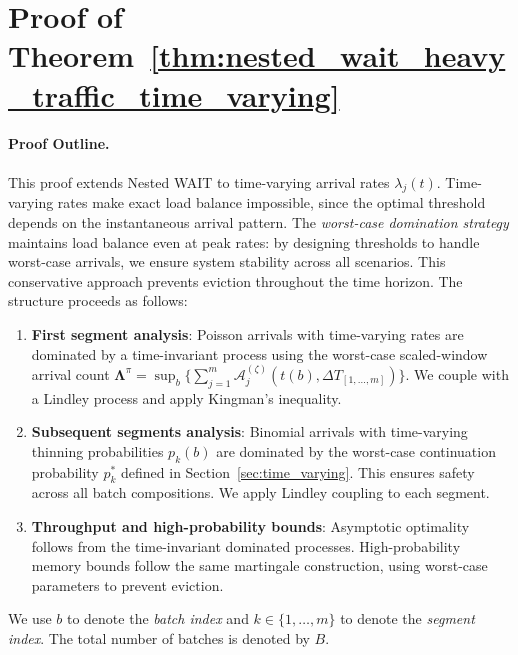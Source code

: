 
\section{Proof of Theorem~\ref{thm:nested_wait_heavy_traffic_time_varying}}\label{appendix:: proof of nested optimality, time varying.}

\paragraph{Proof Outline.}
This proof extends Nested WAIT to time-varying arrival rates $\lambda_j(t)$. Time-varying rates make exact load balance impossible, since the optimal threshold depends on the instantaneous arrival pattern. The \emph{worst-case domination strategy} maintains load balance even at peak rates: by designing thresholds to handle worst-case arrivals, we ensure system stability across all scenarios. This conservative approach prevents eviction throughout the time horizon. The structure proceeds as follows:
\begin{enumerate}
    \item \textbf{First segment analysis}: Poisson arrivals with time-varying rates are dominated by a time-invariant process using the worst-case scaled-window arrival count $\mathbf{\Lambda}^{\pi} = \sup_b \{\sum_{j=1}^m \mathcal A_j^{(\zeta)}(t(b),\Delta T_{[1,\ldots,m]})\}$. We couple with a Lindley process and apply Kingman's inequality.
    \item \textbf{Subsequent segments analysis}: Binomial arrivals with time-varying thinning probabilities $p_k(b)$ are dominated by the worst-case continuation probability \(p_k^*\) defined in Section~\ref{sec:time_varying}. This ensures safety across all batch compositions. We apply Lindley coupling to each segment.
    \item \textbf{Throughput and high-probability bounds}: Asymptotic optimality follows from the time-invariant dominated processes. High-probability memory bounds follow the same martingale construction, using worst-case parameters to prevent eviction.
\end{enumerate}

We use $b$ to denote the \emph{batch index} and $k \in \{1, \ldots, m\}$ to denote the \emph{segment index}. The total number of batches is denoted by $B$.

